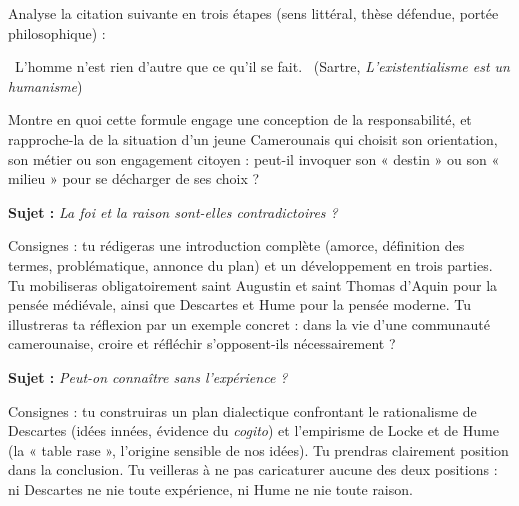 \documentclass[11pt]{article}
\newcommand{\cle}[1]{{\popxbold\color{popdark}#1}}
\newcounter{popsec}
\newcounter{popsub}
\newcommand{\courssub}[1]{%
  \stepcounter{popsub}%
  \par\vspace{9pt}\noindent{\popxbold\fontsize{11.5}{13}\selectfont\color{popink}{\color{poporange}\thepopsec.\thepopsub}\hspace{6pt}#1}\par\nopagebreak\vspace{4pt}
}
\begin{document}
\begin{exercice}
Analyse la citation suivante en trois étapes (sens littéral, thèse défendue, portée philosophique) :

\guillemotleft\ L'homme n'est rien d'autre que ce qu'il se fait. \guillemotright\ (Sartre, \emph{L'existentialisme est un humanisme})

Montre en quoi cette formule engage une conception de la responsabilité, et rapproche-la de la situation d'un jeune Camerounais qui choisit son orientation, son métier ou son engagement citoyen : peut-il invoquer son « destin » ou son « milieu » pour se décharger de ses choix ?
\end{exercice}

\courssub{Je me prépare au Bac}

\begin{exercice}
\textbf{Sujet :} \emph{La foi et la raison sont-elles contradictoires ?}

Consignes : tu rédigeras une introduction complète (amorce, définition des termes, problématique, annonce du plan) et un développement en trois parties. Tu mobiliseras obligatoirement saint Augustin et saint Thomas d'Aquin pour la pensée médiévale, ainsi que Descartes et Hume pour la pensée moderne. Tu illustreras ta réflexion par un exemple concret : dans la vie d'une communauté camerounaise, croire et réfléchir s'opposent-ils nécessairement ?
\end{exercice}

\begin{exercice}
\textbf{Sujet :} \emph{Peut-on connaître sans l'expérience ?}

Consignes : tu construiras un plan dialectique confrontant le \cle{rationalisme} de Descartes (idées innées, évidence du \emph{cogito}) et l'\cle{empirisme} de Locke et de Hume (la « table rase », l'origine sensible de nos idées). Tu prendras clairement position dans la conclusion. Tu veilleras à ne pas caricaturer aucune des deux positions : ni Descartes ne nie toute expérience, ni Hume ne nie toute raison.
\end{exercice}
\end{document}
